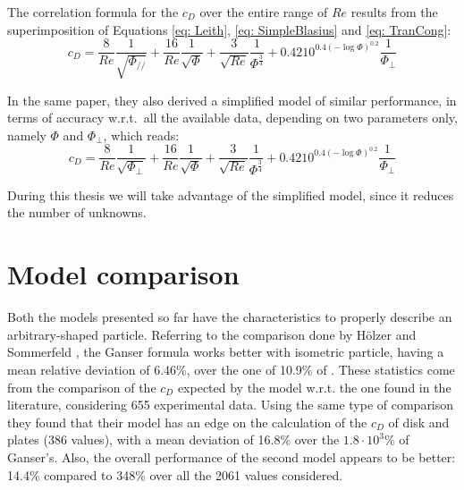 		The correlation formula for the $ c_D $ over the entire range of $ Re  $ results from the superimposition of Equations \ref{eq: Leith}, \ref{eq: SimpleBlasius} and \ref{eq: TranCong}:
		\begin{equation}
			c_D = \frac{8}{Re} \frac{1}{\sqrt{\Phi_{/\!/}}} 
			    + \frac{16}{Re} \frac{1}{\sqrt{\Phi}} 
			    + \frac{3}{\sqrt{Re}} \frac{1}{\Phi^{\frac{3}{4}}} 
			    + 0.4210^{0.4(-\log \Phi)^{0.2}} \frac{1}{\Phi_{\perp}}
			\label{eq: HS}
		\end{equation}
	
		In the same paper, they also derived a simplified model of similar performance, in terms of accuracy w.r.t.\ all the available data, depending on two parameters only, namely $\Phi$ and $\Phi_{\perp}$, which reads:
		\begin{equation}
			c_D = \frac{8}{Re} \frac{1}{\sqrt{\Phi_{\perp}}} 
			    + \frac{16}{Re} \frac{1}{\sqrt{\Phi}} 
			    + \frac{3}{\sqrt{Re}} \frac{1}{\Phi^{\frac{3}{4}}} 
			    + 0.4210^{0.4(-\log \Phi)^{0.2}} \frac{1}{\Phi_{\perp}}
			\label{eq: SimpleHS}
		\end{equation}
		
		During this thesis we will take advantage of the simplified model, since it reduces the number of unknowns.
		

	\section{Model comparison}
		Both the models presented so far have the characteristics to properly describe an arbitrary-shaped particle. Referring to the comparison done by H\"{o}lzer and Sommerfeld \cite{HoltzerSommerfeld-2008}, the Ganser formula works better with isometric particle, having a mean relative deviation of 6.46\%, over the one of 10.9\% of . These statistics come from the comparison of the $ c_D $ expected by the model w.r.t. the one found in the literature, considering 655 experimental data. Using the same type of comparison they found that their model has an edge on the calculation of the $ c_D $ of disk and plates (386 values), with a mean deviation of 16.8\% over the $ 1.8 \cdot 10^3 \% $ of Ganser's. Also, the overall performance of the second model appears to be better: 14.4\% compared to 348\% over all the 2061 values considered. 
		
